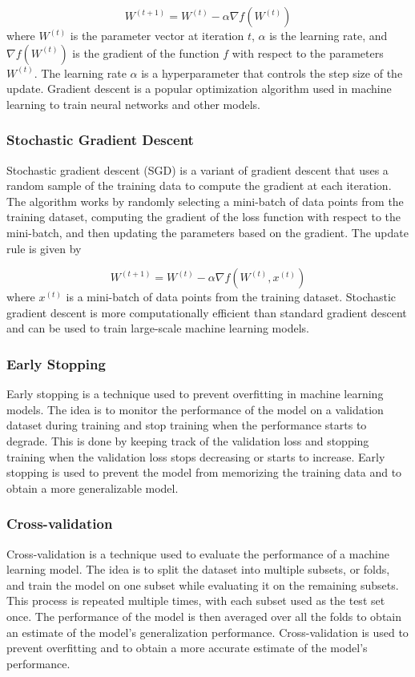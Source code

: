 \documentclass{article}
\begin{document}
$$
    W^{(t+1)} = W^{(t)} - \alpha \nabla f(W^{(t)})
$$
where $W^{(t)}$ is the parameter vector at iteration $t$, $\alpha$ is the learning rate, and $\nabla f(W^{(t)})$ is the gradient of the function $f$ with respect to the parameters $W^{(t)}$. The learning rate $\alpha$ is a hyperparameter that controls the step size of the update. Gradient descent is a popular optimization algorithm used in machine learning to train neural networks and other models.

\subsubsection{Stochastic Gradient Descent}
Stochastic gradient descent (SGD) is a variant of gradient descent that uses a random sample of the training data to compute the gradient at each iteration. The algorithm works by randomly selecting a mini-batch of data points from the training dataset, computing the gradient of the loss function with respect to the mini-batch, and then updating the parameters based on the gradient. The update rule is given by

$$
    W^{(t+1)} = W^{(t)} - \alpha \nabla f(W^{(t)}, x^{(t)})
$$
where $x^{(t)}$ is a mini-batch of data points from the training dataset. Stochastic gradient descent is more computationally efficient than standard gradient descent and can be used to train large-scale machine learning models.

\subsubsection{Early Stopping}
Early stopping is a technique used to prevent overfitting in machine learning models. The idea is to monitor the performance of the model on a validation dataset during training and stop training when the performance starts to degrade. This is done by keeping track of the validation loss and stopping training when the validation loss stops decreasing or starts to increase. Early stopping is used to prevent the model from memorizing the training data and to obtain a more generalizable model. 

\subsubsection{Cross-validation}
Cross-validation is a technique used to evaluate the performance of a machine learning model. The idea is to split the dataset into multiple subsets, or folds, and train the model on one subset while evaluating it on the remaining subsets. This process is repeated multiple times, with each subset used as the test set once. The performance of the model is then averaged over all the folds to obtain an estimate of the model's generalization performance. Cross-validation is used to prevent overfitting and to obtain a more accurate estimate of the model's performance.
\end{document}
